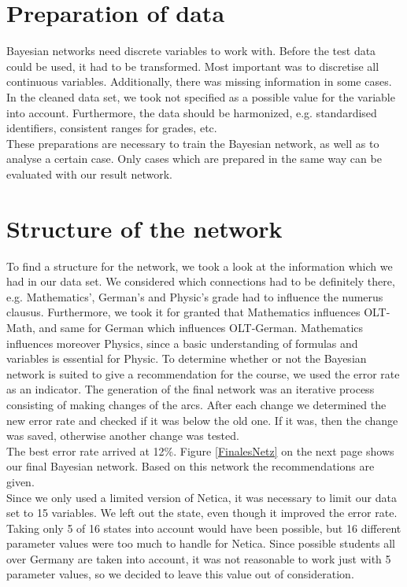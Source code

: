 \documentclass[%
	pdftex,
	oneside,        %
	11pt,           %
	parskip=half,   %
	headsepline,    %
	footsepline,    %
	abstracton,     %
	USenglish,      %
	a4paper,        %
]{report}
\begin{document}
\chapter{Preparation of data}
Bayesian networks need discrete variables to work with. Before the test data could be used, it had to be transformed. Most important was to discretise all continuous variables. Additionally, there was missing information in some cases. In the cleaned data set, we took not specified as a possible value for the variable into account. Furthermore, the data should be harmonized, e.g. standardised identifiers, consistent ranges for grades, etc.\\
These preparations are necessary to train the Bayesian network, as well as to analyse a certain case. Only cases which are prepared in the same way can be evaluated with our result network. 

\chapter{Structure of the network}
To find a structure for the network, we took a look at the information which we had in our data set. We considered which connections had to be definitely there, e.g. Mathematics', German's and Physic's grade had to influence the numerus clausus. Furthermore, we took it for granted that Mathematics influences OLT-Math, and same for German which influences OLT-German. Mathematics influences moreover Physics, since a basic understanding of formulas and variables is essential for Physic. To determine whether or not the Bayesian network is suited to give a recommendation for the course, we used the error rate as an indicator. The generation of the final network was an iterative process consisting of making changes of the arcs. After each change we determined the new error rate and checked if it was below the old one. If it was, then the change was saved, otherwise another change was tested.\\
The best error rate arrived at 12\%. Figure \ref{FinalesNetz}  on the next page shows our final Bayesian network. Based on this network the recommendations are given.\\
Since we only used a limited version of Netica, it was necessary to limit our data set to 15 variables. We left out the state, even though it improved the error rate. Taking only 5 of 16 states into account would have been possible, but 16 different parameter values were too much to handle for Netica. Since possible students all over Germany are taken into account, it was not reasonable to work just with 5 parameter values, so we decided to leave this value out of consideration.
\end{document}
